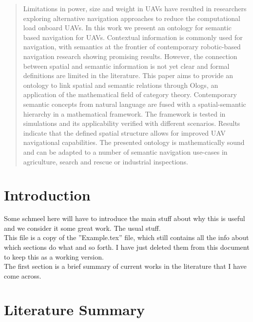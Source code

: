 \documentclass[twocolumn,letterpaper]{IEEEAerospaceCLS}  %
\begin{document}
\begin{abstract}
Limitations in power, size and weight in UAVs have resulted in researchers exploring alternative navigation approaches to reduce the computational load onboard UAVs. In this work we present an ontology for semantic based navigation for UAVs. Contextual information is commonly used for navigation, with semantics at the frontier of contemporary robotic-based navigation research showing promising results. However, the connection between spatial and semantic information is not yet clear and formal definitions are limited in the literature. This paper aims to provide an ontology to link spatial and semantic relations through Ologs, an application of the mathematical field of category theory. Contemporary semantic concepts from natural language are fused with a spatial-semantic hierarchy in a mathematical framework. The framework is tested in simulations and its applicability verified with different scenarios. Results indicate that the defined spatial structure allows for improved UAV navigational capabilities. The presented ontology is mathematically sound and can be adapted to a number of semantic navigation use-cases in agriculture, search and rescue or industrial inspections.
\end{abstract} 


\tableofcontents

\section{Introduction} \label{sec:Intro}
Some schmeel here will have to introduce the main stuff about why this is useful and we consider it some great work. The usual stuff.\\
This file is a copy of the ''Example.tex'' file, which still contains all the info about which sections do what and so forth. I have just deleted them from this document to keep this as a working version.\\
The first section is a brief summary of current works in the literature that I have come across.

\section{Literature Summary} \label{sec:Lit}


\appendices{}              %
\end{document}
